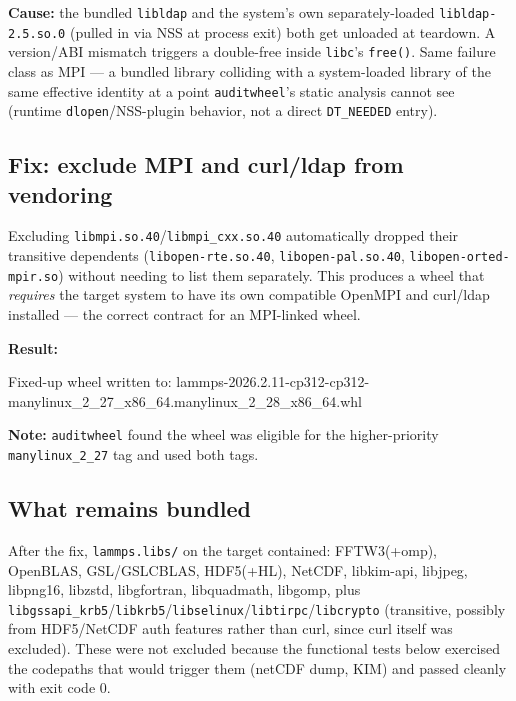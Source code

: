 \documentclass[11pt]{article}
\begin{document}
\textbf{Cause:} the bundled \texttt{libldap} and the system's own separately-loaded
\texttt{libldap-2.5.so.0} (pulled in via NSS at process exit) both get unloaded
at teardown.  A version/ABI mismatch triggers a double-free inside
\texttt{libc}'s \texttt{free()}.  Same failure class as MPI --- a bundled
library colliding with a system-loaded library of the same effective identity at
a point \texttt{auditwheel}'s static analysis cannot see (runtime
\texttt{dlopen}/NSS-plugin behavior, not a direct \texttt{DT\_NEEDED} entry).

\subsection{Fix: exclude MPI and curl/ldap from vendoring}


Excluding \texttt{libmpi.so.40}/\texttt{libmpi\_cxx.so.40} automatically
dropped their transitive dependents (\texttt{libopen-rte.so.40},
\texttt{libopen-pal.so.40}, \texttt{libopen-orted-mpir.so}) without needing
to list them separately.  This produces a wheel that \emph{requires} the target
system to have its own compatible OpenMPI and curl/ldap installed --- the
correct contract for an MPI-linked wheel.

\textbf{Result:}
\begin{codebox}[]
Fixed-up wheel written to:
lammps-2026.2.11-cp312-cp312-manylinux_2_27_x86_64.manylinux_2_28_x86_64.whl
\end{codebox}

\textbf{Note:} \texttt{auditwheel} found the wheel was eligible for the higher-priority
\texttt{manylinux\_2\_27} tag and used both tags.

\subsection{What remains bundled}

After the fix, \texttt{lammps.libs/} on the target contained: FFTW3(+omp),
OpenBLAS, GSL/GSLCBLAS, HDF5(+HL), NetCDF, libkim-api, libjpeg, libpng16,
libzstd, libgfortran, libquadmath, libgomp, plus
\texttt{libgssapi\_krb5}/\texttt{libkrb5}/\texttt{libselinux}/\texttt{libtirpc}/\texttt{libcrypto}
(transitive, possibly from HDF5/NetCDF auth features rather than curl, since
curl itself was excluded).  These were not excluded because the functional tests
below exercised the codepaths that would trigger them (netCDF dump, KIM) and
passed cleanly with exit code 0.
\end{document}
